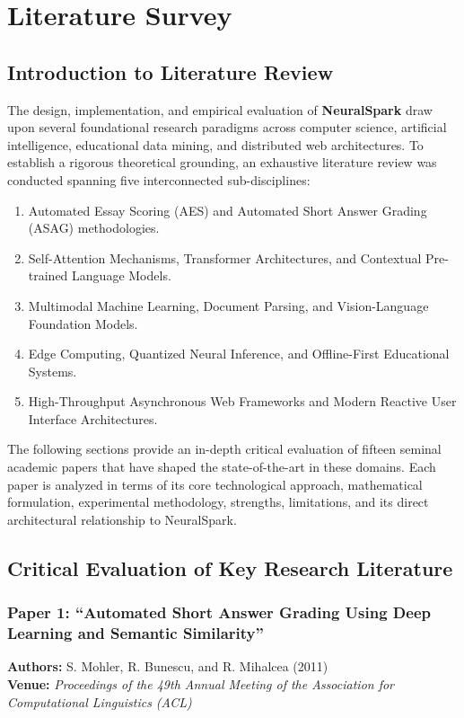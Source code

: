 \chapter{Literature Survey}

\section{Introduction to Literature Review}
The design, implementation, and empirical evaluation of \textbf{NeuralSpark} draw upon several foundational research paradigms across computer science, artificial intelligence, educational data mining, and distributed web architectures. To establish a rigorous theoretical grounding, an exhaustive literature review was conducted spanning five interconnected sub-disciplines:
\begin{enumerate}[leftmargin=*]
    \item Automated Essay Scoring (AES) and Automated Short Answer Grading (ASAG) methodologies.
    \item Self-Attention Mechanisms, Transformer Architectures, and Contextual Pre-trained Language Models.
    \item Multimodal Machine Learning, Document Parsing, and Vision-Language Foundation Models.
    \item Edge Computing, Quantized Neural Inference, and Offline-First Educational Systems.
    \item High-Throughput Asynchronous Web Frameworks and Modern Reactive User Interface Architectures.
\end{enumerate}

The following sections provide an in-depth critical evaluation of fifteen seminal academic papers that have shaped the state-of-the-art in these domains. Each paper is analyzed in terms of its core technological approach, mathematical formulation, experimental methodology, strengths, limitations, and its direct architectural relationship to NeuralSpark.

\section{Critical Evaluation of Key Research Literature}

\subsection{Paper 1: ``Automated Short Answer Grading Using Deep Learning and Semantic Similarity''}
\textbf{Authors:} S. Mohler, R. Bunescu, and R. Mihalcea (2011) \cite{mohler2011} \\
\textbf{Venue:} \textit{Proceedings of the 49th Annual Meeting of the Association for Computational Linguistics (ACL)}

